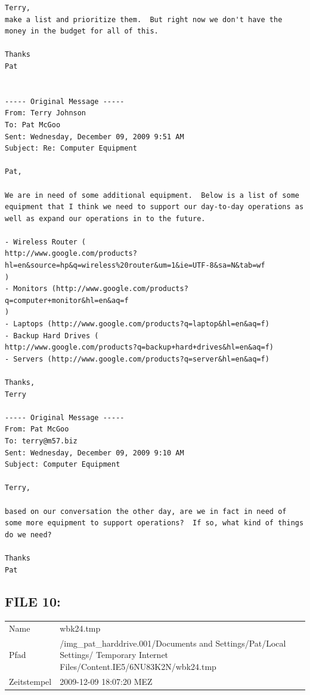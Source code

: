 \begin{lstlisting}
Terry,
make a list and prioritize them.  But right now we don't have the 
money in the budget for all of this.

Thanks
Pat


----- Original Message -----
From: Terry Johnson
To: Pat McGoo
Sent: Wednesday, December 09, 2009 9:51 AM
Subject: Re: Computer Equipment

Pat,

We are in need of some additional equipment.  Below is a list of some
equipment that I think we need to support our day-to-day operations as
well as expand our operations in to the future.

- Wireless Router (
http://www.google.com/products?hl=en&source=hp&q=wireless%20router&um=1&ie=UTF-8&sa=N&tab=wf
)
- Monitors (http://www.google.com/products?q=computer+monitor&hl=en&aq=f
)
- Laptops (http://www.google.com/products?q=laptop&hl=en&aq=f)
- Backup Hard Drives (
http://www.google.com/products?q=backup+hard+drives&hl=en&aq=f)
- Servers (http://www.google.com/products?q=server&hl=en&aq=f)

Thanks,
Terry

----- Original Message -----
From: Pat McGoo
To: terry@m57.biz
Sent: Wednesday, December 09, 2009 9:10 AM
Subject: Computer Equipment

Terry,

based on our conversation the other day, are we in fact in need of
some more equipment to support operations?  If so, what kind of things
do we need? 

Thanks
Pat
\end{lstlisting}

\subsection{FILE 10:}
\label{sec:pat_emails_10}	

\begin{table}[htb]
	\begin{tabular}{p{2cm} p{13.5cm}}
		Name & wbk24.tmp\\
		Pfad & /img_pat_harddrive.001/Documents and Settings/Pat/Local Settings/ Temporary Internet Files/Content.IE5/6NU83K2N/wbk24.tmp\\
		Zeitstempel & 2009-12-09 18:07:20 MEZ
	\end{tabular}
\end{table}	


